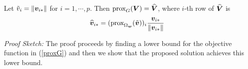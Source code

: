 \begin{theorem} Let $\tilde{v}_i = \| \boldsymbol{v}_{i {\ast}}\|$ for $i = 1, \cdots, p$. Then
$\textnormal{prox}_{G}(\boldsymbol{V}) = \widehat {\boldsymbol{V}}$, where $i$-th row of $\widehat {\boldsymbol{V}}$ is
\begin{eqnarray}\label{Vhat}
\widehat \bv_{i \a} =  (\textnormal{prox}_{\Omega_{\bw}}(\tilde{\bv}))_i \frac{\bv_{i\a}}{\|\bv_{i \a}\|}
\end{eqnarray}
\end{theorem}
\textit{Proof Sketch:} The proof proceeds by finding a lower bound for the objective function in (\ref{proxG}) and then we show that the proposed solution achieves this lower bound.




